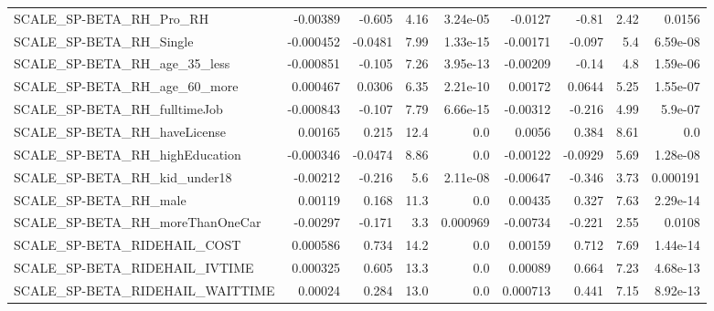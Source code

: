 \begin{tabular}{lrrrrrrrr}
SCALE\_SP-BETA\_RH\_Pro\_RH                            &    -0.00389 &       -0.605 &     4.16 & 3.24e-05 &    -0.0127 &       -0.81 &         2.42 &        0.0156 \\
SCALE\_SP-BETA\_RH\_Single                            &   -0.000452 &      -0.0481 &     7.99 & 1.33e-15 &   -0.00171 &      -0.097 &          5.4 &      6.59e-08 \\
SCALE\_SP-BETA\_RH\_age\_35\_less                       &   -0.000851 &       -0.105 &     7.26 & 3.95e-13 &   -0.00209 &       -0.14 &          4.8 &      1.59e-06 \\
SCALE\_SP-BETA\_RH\_age\_60\_more                       &    0.000467 &       0.0306 &     6.35 & 2.21e-10 &    0.00172 &      0.0644 &         5.25 &      1.55e-07 \\
SCALE\_SP-BETA\_RH\_fulltimeJob                       &   -0.000843 &       -0.107 &     7.79 & 6.66e-15 &   -0.00312 &      -0.216 &         4.99 &       5.9e-07 \\
SCALE\_SP-BETA\_RH\_haveLicense                       &     0.00165 &        0.215 &     12.4 &      0.0 &     0.0056 &       0.384 &         8.61 &           0.0 \\
SCALE\_SP-BETA\_RH\_highEducation                     &   -0.000346 &      -0.0474 &     8.86 &      0.0 &   -0.00122 &     -0.0929 &         5.69 &      1.28e-08 \\
SCALE\_SP-BETA\_RH\_kid\_under18                       &    -0.00212 &       -0.216 &      5.6 & 2.11e-08 &   -0.00647 &      -0.346 &         3.73 &      0.000191 \\
SCALE\_SP-BETA\_RH\_male                              &     0.00119 &        0.168 &     11.3 &      0.0 &    0.00435 &       0.327 &         7.63 &      2.29e-14 \\
SCALE\_SP-BETA\_RH\_moreThanOneCar                    &    -0.00297 &       -0.171 &      3.3 & 0.000969 &   -0.00734 &      -0.221 &         2.55 &        0.0108 \\
SCALE\_SP-BETA\_RIDEHAIL\_COST                        &    0.000586 &        0.734 &     14.2 &      0.0 &    0.00159 &       0.712 &         7.69 &      1.44e-14 \\
SCALE\_SP-BETA\_RIDEHAIL\_IVTIME                      &    0.000325 &        0.605 &     13.3 &      0.0 &    0.00089 &       0.664 &         7.23 &      4.68e-13 \\
SCALE\_SP-BETA\_RIDEHAIL\_WAITTIME                    &     0.00024 &        0.284 &     13.0 &      0.0 &   0.000713 &       0.441 &         7.15 &      8.92e-13 \\

\end{tabular}
